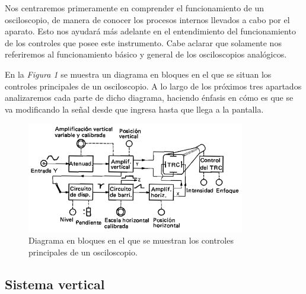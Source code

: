 \documentclass{article}
\begin{document}
	Nos centraremos primeramente en comprender el funcionamiento de un osciloscopio, de manera de conocer los procesos internos llevados a cabo por el aparato. Esto nos ayudará más adelante en el entendimiento del funcionamiento de los controles que posee este instrumento. Cabe aclarar que solamente nos referiremos al funcionamiento básico y general de los osciloscopios analógicos.
	\par
	En la \textit{Figura 1} se muestra un diagrama en bloques en el que se situan los controles principales de un osciloscopio. A lo largo de los próximos tres apartados analizaremos cada parte de dicho diagrama, haciendo énfasis en cómo es que se va modificando la señal desde que ingresa hasta que llega a la pantalla.
\bigskip\bigskip


\begin{figure}[h]
	\centering
	\includegraphics[width=0.85\textwidth]{images/01-diagrama-bloques-osc.jpg}
	\medskip
	\caption{Diagrama en bloques en el que se muestran los controles\\ principales de un osciloscopio.}
\end{figure}
\bigskip



\subsection{Sistema vertical}
	
\end{document}
